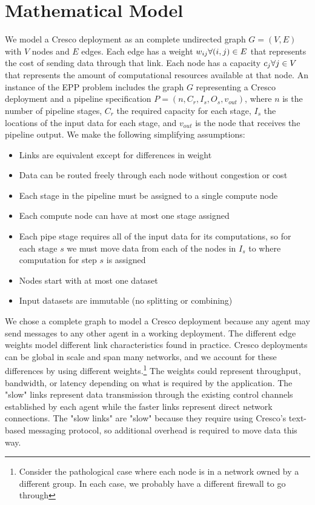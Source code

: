 \documentclass{article}
\newcommand{\forallv}[1]{\ensuremath{\forall #1 \in V}}
\newcommand{\foralle}[2]{\ensuremath{\forall (#1,#2) \in E }}
\newcommand{\eppInstance}{\ensuremath{n,C_{r},I_{s},O_{s},v_{out}}}
\begin{document}
    \section{Mathematical Model}
	We model a Cresco deployment as an complete undirected graph $G=(V,E)$ with $V$ nodes and $E$ edges. Each edge has a weight $w_{ij} \space \foralle{i}{j}$ that represents the cost of sending data through that link. Each node has a capacity $c_{j} \space \forallv{j}$ that represents the amount of computational resources available at that node. An instance of the EPP problem includes the graph $G$ representing a Cresco deployment and a pipeline specification $P = (\eppInstance)$, where  $n$ is the number of pipeline stages, $C_{r}$ the required capacity for each stage, $I_{s}$ the locations of the input data for each stage, and $v_{out}$ is the node that receives the pipeline output. We make the following simplifying assumptions:
	\begin{itemize}
		\item Links are equivalent except for differences in weight
		\item Data can be routed freely through each node without congestion or cost
		\item Each stage in the pipeline must be assigned to a single compute node
		\item Each compute node can have at most one stage assigned
		\item Each pipe stage requires all of the input data for its computations, so for each stage $s$ we must move data from each of the nodes in $I_{s}$ to where computation for step $s$ is assigned
		\item Nodes start with at most one dataset
		\item Input datasets are immutable (no splitting or combining)
	\end{itemize}
	
	We chose a complete graph to model a Cresco deployment because any agent may send messages to any other agent in a working deployment. The different edge weights model different link characteristics found in practice. Cresco deployments can be global in scale and span many networks, and we account for these differences by using different weights.\footnote{Consider the pathological case where each node is in a network owned by a different group. In each case, we probably have a different firewall to go through} The weights could represent throughput, bandwidth, or latency depending on what is required by the application. The "slow" links represent data transmission through the existing control channels established by each agent while the faster links represent direct network connections. The "slow links" are "slow" because they require using Cresco's text-based messaging protocol, so additional overhead is required to move data this way.
	
\end{document}
